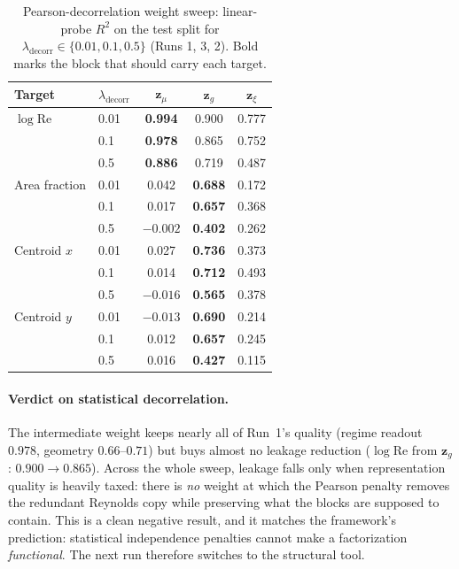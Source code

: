 \documentclass[11pt]{article}
\begin{document}
\begin{table}[htbp]
  \centering
  \caption{Pearson-decorrelation weight sweep: linear-probe $R^2$ on the
  test split for $\lambda_{\mathrm{decorr}} \in \{0.01, 0.1, 0.5\}$
  (Runs 1, 3, 2). Bold marks the block that should carry each target.}
  \label{tab:probes-run3}
  \begin{tabular}{llccc}
    \toprule
    Target & $\lambda_{\mathrm{decorr}}$ & $\boldsymbol{z}_{\mu}$ & $\boldsymbol{z}_{g}$ & $\boldsymbol{z}_{\xi}$ \\
    \midrule
    $\log \mathrm{Re}$ & 0.01 & \textbf{0.994} & 0.900 & 0.777 \\
                       & 0.1  & \textbf{0.978} & 0.865 & 0.752 \\
                       & 0.5  & \textbf{0.886} & 0.719 & 0.487 \\
    \midrule
    Area fraction      & 0.01 & 0.042    & \textbf{0.688} & 0.172 \\
                       & 0.1  & 0.017    & \textbf{0.657} & 0.368 \\
                       & 0.5  & $-0.002$ & \textbf{0.402} & 0.262 \\
    \midrule
    Centroid $x$       & 0.01 & 0.027    & \textbf{0.736} & 0.373 \\
                       & 0.1  & 0.014    & \textbf{0.712} & 0.493 \\
                       & 0.5  & $-0.016$ & \textbf{0.565} & 0.378 \\
    \midrule
    Centroid $y$       & 0.01 & $-0.013$ & \textbf{0.690} & 0.214 \\
                       & 0.1  & 0.012    & \textbf{0.657} & 0.245 \\
                       & 0.5  & 0.016    & \textbf{0.427} & 0.115 \\
    \bottomrule
  \end{tabular}
\end{table}

\paragraph{Verdict on statistical decorrelation.} The intermediate weight
keeps nearly all of Run~1's quality (regime readout $0.978$, geometry
$0.66$--$0.71$) but buys almost no leakage reduction
($\log \mathrm{Re}$ from $\boldsymbol{z}_{g}$: $0.900 \to 0.865$). Across
the whole sweep, leakage falls only when representation quality is
heavily taxed: there is \emph{no} weight at which the Pearson penalty
removes the redundant Reynolds copy while preserving what the blocks are
supposed to contain. This is a clean negative result, and it matches the
framework's prediction: statistical independence penalties cannot make a
factorization \emph{functional}. The next run therefore switches to the
structural tool.
\end{document}
